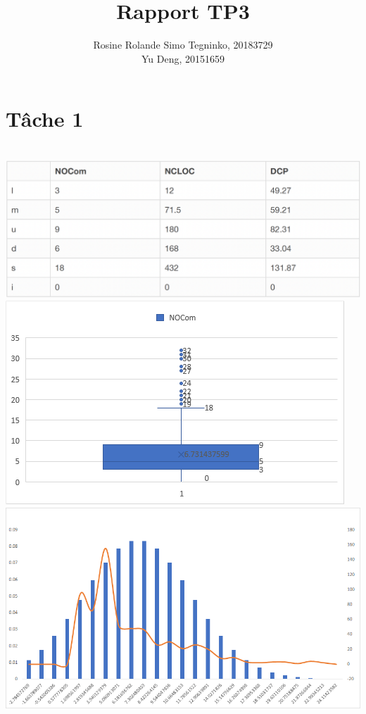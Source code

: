 \documentclass{article}
\title{Rapport TP3}
\author{Rosine Rolande Simo Tegninko, 20183729\\
Yu Deng, 20151659}
\date{}
\begin{document}
\maketitle

\section*{Tâche 1}\\
\includegraphics[scale=0.3]{T1_1.png}\\
\includegraphics[scale=0.5]{NOCom.png}
\includegraphics[scale=0.35]{T1_2.png}\\
\end{document}
